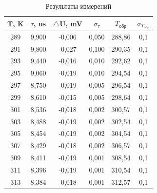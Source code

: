 \documentclass[12pt,a4paper]{article}
\begin{document}
\begin{table}[h!]
\centering
\begin{tabular}{|c|c|c|c|c|c|}
\hline
\textbf{T, K} & \textbf{$\tau$, us} & \textbf{$\triangle$U, mV} & \textbf{$\sigma_{\tau}$} & \textbf{$T_{\text{обр}}$} & \textbf{$\sigma_{T_{\text{обр}}}$} \\ \hline
289           & 9,900              & -0,006                    & 0,050                    & 288,86                    & 0,1                                \\ \hline
291           & 9,800              & -0,027                    & 0,100                    & 290,35                    & 0,1                                \\ \hline
293           & 9,440              & -0,016                    & 0,010                    & 292,62                    & 0,1                                \\ \hline
295           & 9,060              & -0,019                    & 0,010                    & 294,54                    & 0,1                                \\ \hline
297           & 8,750              & -0,019                    & 0,005                    & 296,54                    & 0,1                                \\ \hline
299           & 8,610              & -0,015                    & 0,005                    & 298,64                    & 0,1                                \\ \hline
301           & 8,536              & -0,018                    & 0,002                    & 300,57                    & 0,1                                \\ \hline
303           & 8,488              & -0,019                    & 0,002                    & 302,54                    & 0,1                                \\ \hline
305           & 8,454              & -0,019                    & 0,002                    & 304,54                    & 0,1                                \\ \hline
307           & 8,429              & -0,018                    & 0,002                    & 306,57                    & 0,1                                \\ \hline
309           & 8,411              & -0,019                    & 0,001                    & 308,54                    & 0,1                                \\ \hline
311           & 8,396              & -0,019                    & 0,001                    & 310,54                    & 0,1                                \\ \hline
313           & 8,384              & -0,018                    & 0,001                    & 312,57                    & 0,1                                \\ \hline
\end{tabular}
\caption{Результаты измерений}
\end{table}
\end{document}
